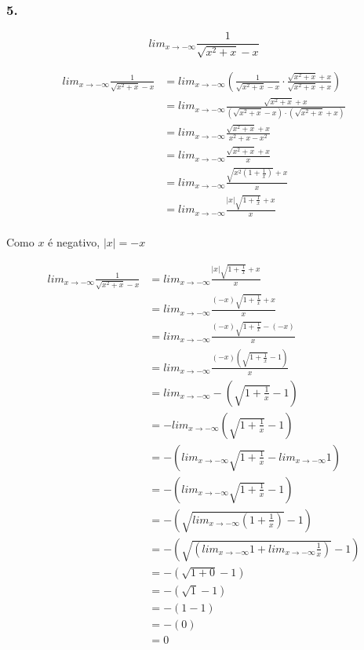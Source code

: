 \documentclass{article}
\begin{document}
\subsubsection*{5.}

\[
    lim_{x\to -\infty} \frac{1}{\sqrt{x^2+x}-x}
\]


\begin{align*}
    lim_{x\to -\infty} \frac{1}{\sqrt{x^2+x}-x}
     & = lim_{x\to -\infty} \left(\frac{1}{\sqrt{x^2+x}-x} \cdot \frac{\sqrt{x^2+x}+x}{\sqrt{x^2+x}+x} \right) \\
     & = lim_{x\to -\infty} \frac{\sqrt{x^2+x}+x}{(\sqrt{x^2+x}-x) \cdot (\sqrt{x^2+x}+x)}                     \\
     & = lim_{x\to -\infty} \frac{\sqrt{x^2+x}+x}{x^2+x-x^2}                                                   \\
     & = lim_{x\to -\infty} \frac{\sqrt{x^2+x}+x}{x}                                                           \\
     & = lim_{x\to -\infty} \frac{\sqrt{x^2(1+\frac{1}{x})} + x}{x}                                            \\
     & = lim_{x\to -\infty} \frac{|x|\sqrt{1+\frac{1}{x}} + x}{x}                                              \\
\end{align*}

Como \(x\) é negativo, \(|x| = - x\)

\begin{align*}
    lim_{x\to -\infty} \frac{1}{\sqrt{x^2+x}-x}
     & = lim_{x\to -\infty} \frac{|x|\sqrt{1+\frac{1}{x}} + x}{x}                      \\
     & = lim_{x\to -\infty} \frac{(-x)\sqrt{1+\frac{1}{x}} + x}{x}                     \\
     & = lim_{x\to -\infty} \frac{(-x)\sqrt{1+\frac{1}{x}} - (-x)}{x}                  \\
     & = lim_{x\to -\infty} \frac{(-x)\left(\sqrt{1+\frac{1}{x}} - 1\right)}{x}        \\
     & = lim_{x\to -\infty} -\left(\sqrt{1+\frac{1}{x}} - 1\right)                     \\
     & = - lim_{x\to -\infty} \left(\sqrt{1+\frac{1}{x}} - 1\right)                    \\
     & = - \left(lim_{x\to -\infty} \sqrt{1+\frac{1}{x}} - lim_{x\to -\infty} 1\right) \\
     & = - \left(lim_{x\to -\infty} \sqrt{1+\frac{1}{x}} - 1\right)                    \\
     & = - \left( \sqrt{lim_{x\to -\infty}\left(1+\frac{1}{x}\right)} - 1\right)       \\
     & = - \left( \sqrt{\left(lim_{x\to -\infty} 1+ lim_{x\to -\infty} \frac{1}{x}\right)} - 1\right)       \\
     & = - ( \sqrt{1 + 0} - 1)       \\
     & = - ( \sqrt{1} - 1)       \\
     & = - ( 1 - 1)       \\
     & = - ( 0)       \\
     & = 0       \\
\end{align*}
\end{document}
